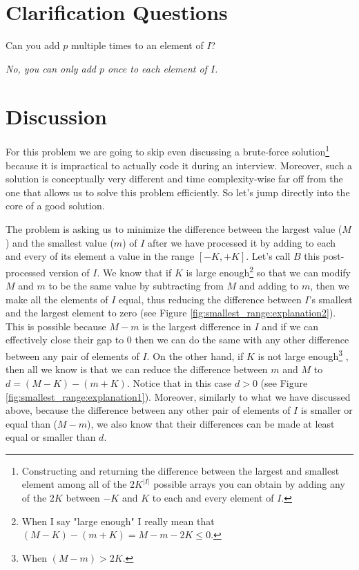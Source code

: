 \section{Clarification Questions}

\begin{QandA}
	\item Can you add $p$ multiple times to an element of $I$?
	\begin{answered}
		\textit{No, you can only add $p$ once to each element of $I$.}
	\end{answered}	
\end{QandA}

\section{Discussion}
\label{smallest_range:sec:discussion}
For this problem we are going to skip even discussing a brute-force solution\footnote{
	Constructing and returning the difference between the largest and smallest element among all of the $2K^{|I|}$ possible arrays you can obtain by adding any of the $2K$ between $-K$ and $K$
	to each and every element of $I$.
} because it is
impractical to actually code it during an interview. 
Moreover, such a solution is conceptually very
different and time complexity-wise far off from the one that allows us to solve this problem
efficiently.
So let's jump directly into the core of a good solution.

The problem is asking us to minimize the difference between the largest value ($M$) and the smallest
value ($m$) of $I$ after we have processed it by adding to each and every of its element a
value in the range $[-K,+K]$. 
Let's call $B$ this post-processed version of $I$. 
We know that if $K$ is large enough\footnote{
	When I say "large enough" I really mean that 
	$(M-K) - (m+K) = M-m-2K \leq 0$.} 
so that we can modify $M$ and $m$ to be the same value
by subtracting from $M$ and adding to $m$, then we make all the elements of $I$ equal,
thus reducing the difference between $I$'s smallest and
the largest element to zero (see Figure \ref{fig:smallest_range:explanation2}).
This is possible because $M-m$ is the  largest difference in $I$ and if we can effectively close their gap to $0$
then we can do the same with any other difference between any pair of elements of $I$.
On the other hand, if $K$ is not large enough\footnote{
	When $(M-m) > 2K$.} , then all we know
is that we can reduce the difference between $m$ and $M$ to $d=(M-K)-(m+K)$.
Notice that in this case $d > 0$  (see Figure \ref{fig:smallest_range:explanation1}).
Moreover, similarly to what we have discussed above, 
because the difference between any other pair of elements of $I$ is smaller or equal than ($M-m$), 
we also know that their differences can be made at least equal or smaller than $d$.


